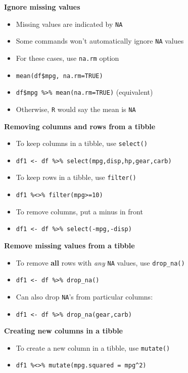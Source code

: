 \documentclass[10pt,landscape]{article}
\begin{document}
\begin{multicols}{3}
\smallskip{}

\textbf{Ignore missing values}\\
\begin{itemize}
    \item Missing values are indicated by \verb!NA!
    \item Some commands won't automatically ignore \verb!NA! values
    \item For these cases, use \verb!na.rm! option
    \item[] \verb!mean(df$mpg, na.rm=TRUE)!
    \item[] \verb!df$mpg %>% mean(na.rm=TRUE)! (equivalent)
    \item Otherwise, \texttt{R} would say the mean is \verb!NA!
\end{itemize}

\smallskip{}

\textbf{Removing columns and rows from a tibble}\\
\begin{itemize}
    \item To keep columns in a tibble, use \verb!select()!
    \item[] \verb!df1 <- df %>% select(mpg,disp,hp,gear,carb)!
    \item To keep rows in a tibble, use \verb!filter()!
    \item[] \verb!df1 %<>% filter(mpg>=10)!
    \item To remove columns, put a minus in front
    \item[] \verb!df1 <- df %>% select(-mpg,-disp)!
\end{itemize}

\smallskip{}

\textbf{Remove missing values from a tibble}\\
\begin{itemize}
    \item To remove \textbf{all} rows with \textit{any} \verb!NA! values, use \verb!drop_na()!
    \item[] \verb!df1 <- df %>% drop_na()!
    \item Can also drop \verb!NA!'s from particular columns:
    \item[] \verb!df1 <- df %>% drop_na(gear,carb)!
\end{itemize}

\smallskip{}

\textbf{Creating new columns in a tibble}\\
\begin{itemize}
    \item To create a new column in a tibble, use \verb!mutate()!
    \item[] \verb!df1 %<>% mutate(mpg.squared = mpg^2)!
\end{itemize}


\end{multicols}
\end{document}
